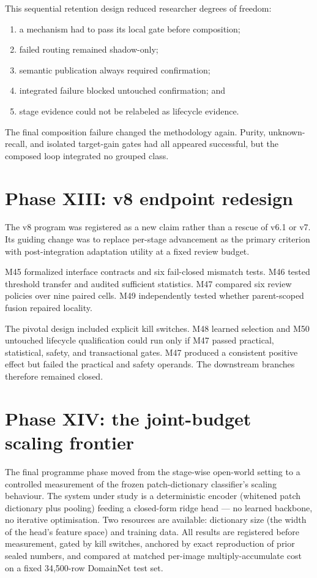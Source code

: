 \documentclass[12pt,oneside]{report}
\begin{document}
This sequential retention design reduced researcher degrees of freedom:

\begin{enumerate}
\item a mechanism had to pass its local gate before composition;
\item failed routing remained shadow-only;
\item semantic publication always required confirmation;
\item integrated failure blocked untouched confirmation; and
\item stage evidence could not be relabeled as lifecycle evidence.
\end{enumerate}

The final composition failure changed the methodology again. Purity,
unknown-recall, and isolated target-gain gates had all appeared successful, but
the composed loop integrated no grouped class.

\section{Phase XIII: v8 endpoint redesign}

The v8 program was registered as a new claim rather than a rescue of v6.1 or
v7. Its guiding change was to replace per-stage advancement as the primary
criterion with post-integration adaptation utility at a fixed review budget.

M45 formalized interface contracts and six fail-closed mismatch tests. M46
tested threshold transfer and audited sufficient statistics. M47 compared six
review policies over nine paired cells. M49 independently tested whether
parent-scoped fusion repaired locality.

The pivotal design included explicit kill switches. M48 learned selection and
M50 untouched lifecycle qualification could run only if M47 passed practical,
statistical, safety, and transactional gates. M47 produced a consistent
positive effect but failed the practical and safety operands. The downstream
branches therefore remained closed.

\section{Phase XIV: the joint-budget scaling frontier}

The final programme phase moved from the stage-wise open-world setting to a
controlled measurement of the frozen patch-dictionary classifier's scaling
behaviour. The system under study is a deterministic encoder (whitened patch
dictionary plus pooling) feeding a closed-form ridge head --- no learned
backbone, no iterative optimisation. Two resources are available: dictionary
size (the width of the head's feature space) and training data. All results
are registered before measurement, gated by kill switches, anchored by exact
reproduction of prior sealed numbers, and compared at matched per-image
multiply-accumulate cost on a fixed 34{,}500-row DomainNet test set.
\end{document}
